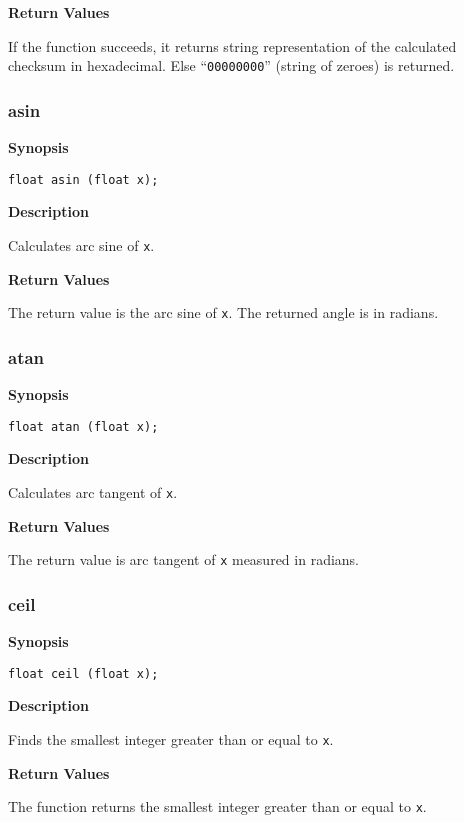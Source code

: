 \documentclass[a4paper, 10pt, titlepage]{article}
\begin{document}
\textbf{Return Values}

If the function succeeds, it returns string representation of the calculated checksum in hexadecimal. Else ``\texttt{00000000}'' (string of zeroes) is returned.

\subsubsection{asin}

\textbf{Synopsis}

\begin{verbatim}
float asin (float x);
\end{verbatim}

\textbf{Description}

Calculates arc sine of \texttt{x}.

\textbf{Return Values}

The return value is the arc sine of \texttt{x}. The returned angle is in radians.

\subsubsection{atan}

\textbf{Synopsis}

\begin{verbatim}
float atan (float x);
\end{verbatim}

\textbf{Description}

Calculates arc tangent of \texttt{x}.

\textbf{Return Values}

The return value is arc tangent of \texttt{x} measured in radians.

\subsubsection{ceil}

\textbf{Synopsis}

\begin{verbatim}
float ceil (float x);
\end{verbatim}

\textbf{Description}

Finds the smallest integer greater than or equal to \texttt{x}.

\textbf{Return Values}

The function returns the smallest integer greater than or equal to \texttt{x}.
\end{document}
